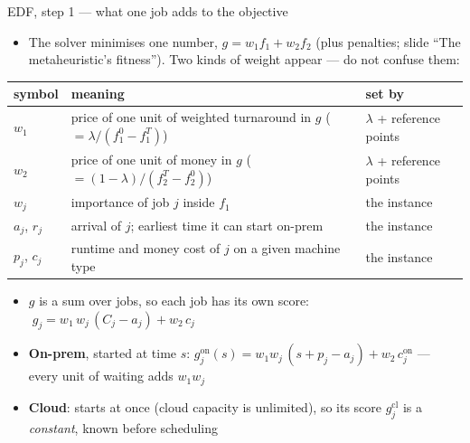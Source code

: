 \documentclass[aspectratio=169,t]{beamer}
\begin{document}
\begin{frame}{EDF, step 1 --- what one job adds to the objective}
  \begin{itemize}
    \item The solver minimises one number,
      $g = w_1 f_1 + w_2 f_2$ (plus penalties; slide ``The metaheuristic's
      fitness''). Two kinds of weight appear --- do not confuse them:
  \end{itemize}
  \begin{center}
  \footnotesize
  \begin{tabular}{@{}lll@{}}
    \toprule
    symbol & meaning & set by \\
    \midrule
    $w_1$ & price of one unit of weighted turnaround in $g$
          ($=\lambda/(f_1^0{-}f_1^T)$) & $\lambda$ + reference points \\
    $w_2$ & price of one unit of money in $g$
          ($=(1{-}\lambda)/(f_2^T{-}f_2^0)$) & $\lambda$ + reference points \\
    $w_j$ & importance of job $j$ inside $f_1$ & the instance \\
    $a_j$, $r_j$ & arrival of $j$; earliest time it can start on-prem & the instance \\
    $p_j$, $c_j$ & runtime and money cost of $j$ on a given machine type & the instance \\
    \bottomrule
  \end{tabular}
  \end{center}
  \begin{itemize}
    \item $g$ is a sum over jobs, so each job has its \alert{own score}:
      $\;g_j = w_1\, w_j\,(C_j - a_j) + w_2\, c_j$
    \item \textbf{On-prem}, started at time $s$: \quad
      $g^{\text{on}}_j(s) = w_1 w_j\,(s + p_j - a_j) + w_2\, c^{\text{on}}_j$
      \quad --- every unit of waiting adds $w_1 w_j$
    \item \textbf{Cloud}: starts at once (cloud capacity is unlimited), so its
      score $g^{\text{cl}}_j$ is a \emph{constant}, known before scheduling
  \end{itemize}
\end{frame}
\end{document}
